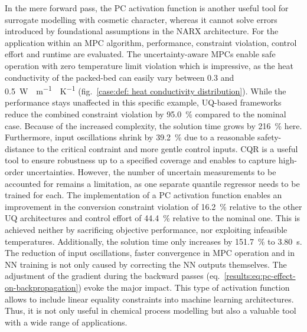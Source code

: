 In the mere forward pass, the PC
activation function is another useful tool for surrogate modelling with cosmetic character, 
whereas it cannot solve errors introduced by foundational assumptions in the NARX architecture.
\newline
\newline
\noindent
For the application within an MPC algorithm, performance, constraint violation, control effort and 
runtime are evaluated.
The uncertainty-aware MPCs enable safe operation with zero temperature limit violation
which is impressive, as the heat conductivity of the packed-bed can easily vary between
\SI{0.3}{} and \SI{0.5}{\watt \; \meter^{-1} \; \kelvin^{-1}} (fig.~\ref{case:def: heat conductivity distribution}).
While the performance stays unaffected in this specific example,
UQ-based frameworks reduce the combined constraint violation by \SI{95.0}{\%} compared to the nominal case. 
Because of the increased complexity, the solution time grows by \SI{216}{\%} here.
Furthermore, input oscillations shrink by \SI{39.2}{\%} due to a reasonable safety-distance
to the critical contraint and more gentle control inputs.
CQR is a useful tool to ensure robustness up to a specified coverage and enables 
to capture high-order uncertainties. However, the number of uncertain measurements to be accounted
for remains a limitation, as one separate quantile regressor needs to be trained for each.
\newline
\newline
\noindent
The implementation of a PC activation function enables an improvement in the
conversion constraint violation of \SI{16.2}{\%} relative to the other UQ architectures
and control effort of \SI{44.4}{\%} relative to the nominal one.
This is achieved neither by sacrificing objective performance, nor exploiting infeasible
temperatures. Additionally, the solution time only increases by \SI{151.7}{\%} to \SI{3.80}{\second}.
The reduction of input oscillations, faster convergence in MPC operation and in NN training
is not only caused by correcting the NN outputs themselves. The adjustment of the gradient
during the backward passes (eq.~\ref{results:eq:pc-effect-on-backpropagation}) evoke the major impact.
This type of activation function allows to include linear equality constraints into machine learning
architectures. Thus, it is not only useful in chemical process modelling but also
a valuable tool with a wide range of applications.